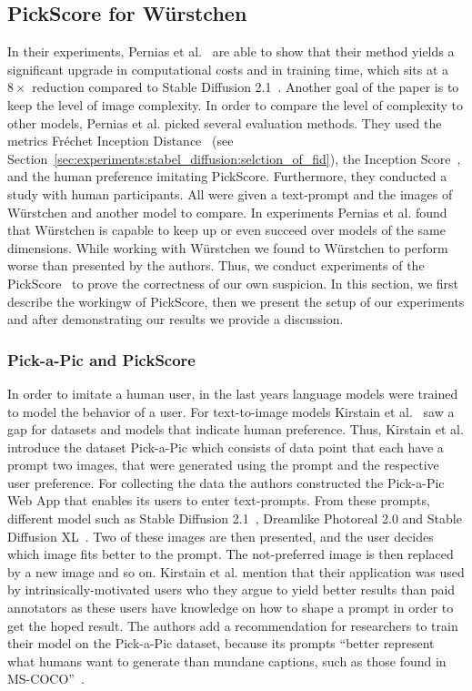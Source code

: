 \subsection{PickScore for W\"urstchen}
In their experiments, Pernias et al.~\cite{pernias2024wrstchen} are able to show
that their method yields a significant upgrade in computational costs and in
training time, which sits at a $8\times$ reduction compared to Stable Diffusion
2.1~\cite{rombach2023sd_2_1}. Another goal of the paper is to keep the level of
image complexity. In order to compare the level of complexity to other models,
Pernias et al. picked several evaluation methods. They used the metrics
Fr\'echet Inception Distance~\cite{heusel2018ganstrainedtimescaleupdate} (see
Section~\ref{sec:experiments:stabel_diffusion:selction_of_fid}), the Inception
Score~\cite{ding2021cogviewmasteringtexttoimagegeneration}, and the human preference imitating
PickScore. Furthermore, they conducted a study with human participants. All were
given a text-prompt and the images of W\"urstchen and another model to compare.
In experiments Pernias et al. found that W\"urstchen is capable to keep up or
even succeed over models of the same dimensions. While working with W\"urstchen
we found to W\"urstchen to perform worse than presented by the authors. Thus, we
conduct experiments of the PickScore~\cite{kirstain2023pickapic} to
prove the correctness of our own suspicion. In this section, we first describe
the workingw of PickScore, then we present the setup of our experiments and
after demonstrating our results we provide a discussion.

\subsubsection{Pick-a-Pic and PickScore}
In order to imitate a human user, in the last years language models were trained
to model the behavior of a user. For text-to-image models Kirstain et
al.~\cite{kirstain2023pickapic} saw a gap for datasets and models that
indicate human preference. Thus, Kirstain et al. introduce the dataset
Pick-a-Pic which consists of data point that each have a prompt two images, that
were generated using the prompt and the respective user preference. For
collecting the data the authors constructed the Pick-a-Pic Web App that enables
its users to enter text-prompts. From these prompts, different model such as
Stable Diffusion 2.1~\cite{rombach2023sd_2_1}, Dreamlike Photoreal 2.0 and
Stable Diffusion XL~\cite{podell2024sdxl}. Two of these images are then
presented, and the user decides which image fits better to the prompt. The
not-preferred image is then replaced by a new image and so on. Kirstain et al.
mention that their application was used by intrinsically-motivated users who
they argue to yield better results than paid annotators as these users have
knowledge on how to shape a prompt in order to get the hoped result. The authors
add a recommendation for researchers to train their model on the Pick-a-Pic
dataset, because its prompts ``better represent what humans want to generate
than mundane captions, such as those found in MS-COCO''~\cite{kirstain2023pickapic}.\\

